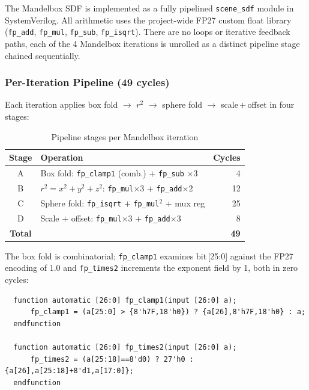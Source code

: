   The Mandelbox SDF is implemented as a fully pipelined \texttt{scene\_sdf}
  module in SystemVerilog. All arithmetic uses the project-wide FP27 custom
  float library (\texttt{fp\_add}, \texttt{fp\_mul}, \texttt{fp\_sub},
  \texttt{fp\_isqrt}). There are no loops or iterative feedback paths,
  each of the 4 Mandelbox iterations is unrolled as a distinct pipeline
  stage chained sequentially.

  \subsubsection*{Per-Iteration Pipeline (49 cycles)}

  Each iteration applies box fold $\to$ $r^2$ $\to$ sphere fold $\to$
  scale\,+\,offset in four stages:

  \begin{table}[h!]
  \centering
  \caption{Pipeline stages per Mandelbox iteration}
  \begin{tabular}{clr}
  \hline
  \textbf{Stage} & \textbf{Operation} & \textbf{Cycles} \\
  \hline
  A & Box fold: \texttt{fp\_clamp1} (comb.) $+$ \texttt{fp\_sub} $\times 3$ & 4 \\
  B & $r^2 = x^2+y^2+z^2$: \texttt{fp\_mul}$\times 3$ $+$ \texttt{fp\_add}$\times 2$ & 12 \\
  C & Sphere fold: \texttt{fp\_isqrt} $+$ \texttt{fp\_mul}$^2$ $+$ mux reg & 25 \\
  D & Scale $+$ offset: \texttt{fp\_mul}$\times 3$ $+$ \texttt{fp\_add}$\times 3$ & 8 \\
  \hline
  \textbf{Total} & & \textbf{49} \\
  \hline
  \end{tabular}
  \end{table}

  \noindent The box fold is combinatorial; \texttt{fp\_clamp1} examines
  bit\,[25:0] against the FP27 encoding of 1.0 and \texttt{fp\_times2}
  increments the exponent field by 1, both in zero cycles:

  \begin{verbatim}
  function automatic [26:0] fp_clamp1(input [26:0] a);
      fp_clamp1 = (a[25:0] > {8'h7F,18'h0}) ? {a[26],8'h7F,18'h0} : a;
  endfunction

  function automatic [26:0] fp_times2(input [26:0] a);
      fp_times2 = (a[25:18]==8'd0) ? 27'h0 : {a[26],a[25:18]+8'd1,a[17:0]};
  endfunction
  \end{verbatim}

